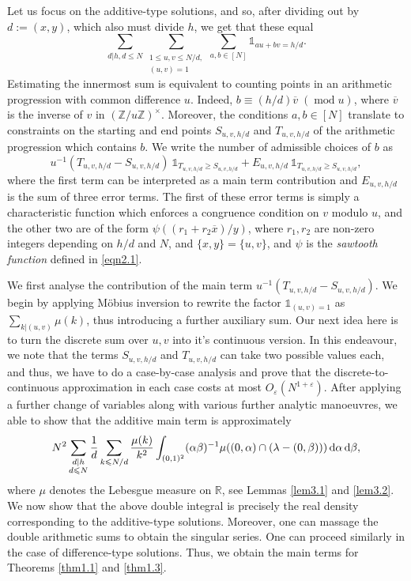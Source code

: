 \documentclass[12pt,reqno]{amsart}
\theoremstyle{definition}
\theoremstyle{remark}
\numberwithin{equation}{section}
\DeclareMathOperator{\Mod}{mod}
\newcommand{\mmod}[1]{\;(\Mod{ #1})}
\renewcommand{\geq}{\geqslant}
\renewcommand{\leq}{\leqslant}
\def\eps{\varepsilon}
\def\d{{\,{\rm d}}}
\newcommand\1{\mathds{1}}
\begin{document}
Let us focus on the additive-type solutions, and so, after dividing out by $d:= (x,y)$, which also must divide $h$, we get that these equal
\[ \sum_{d|h, d \leq N}  \sum_{\substack{ 1 \leq u, v \leq N/d , \\ (u,v) = 1}} \sum_{a,b \in [N]} \1_{au + bv = h/d} .\]
Estimating the innermost sum is equivalent to counting points in an arithmetic progression with common difference $u$. Indeed, $b \equiv (h/d) \overline{v} \mmod{u}$, where $\overline{v}$ is the inverse of $v$ in $(\mathbb{Z}/u \mathbb{Z})^{\times}$. Moreover, the conditions $a,b \in [N]$ translate to constraints on the starting and end points $S_{u,v,h/d}$ and $T_{u,v,h/d}$ of the arithmetic progression which contains $b$. We write the number of admissible choices of $b$ as 
\[ u^{-1}(T_{u,v,h/d} - S_{u,v,h/d} ) \ \1_{T_{u,v,h/d} \geq S_{u,v,h/d}}   + E_{u,v,h/d} \ \1_{T_{u,v,h/d} \geq S_{u,v,h/d}} ,\]
where the first term can be interpreted as a main term contribution and $E_{u,v,h/d}$ is the sum of three error terms. The first of these error terms is simply a characteristic function which enforces a congruence condition on $v$ modulo $u$, and the other two are of the form $\psi((r_1 + r_2 \overline{x})/y)$, where $r_1, r_2$ are non-zero integers depending on $h/d$ and $N$, and $\{x,y\} = \{u,v\}$, and $\psi$ is the \emph{sawtooth function} defined in \eqref{eqn2.1}. 

We first analyse the contribution of the main term $u^{-1}(T_{u,v,h/d} - S_{u,v,h/d} )$. We begin by applying M\"{o}bius inversion to rewrite the factor $\1_{(u,v) =1}$ as $\sum_{k|(u,v)}\mu(k)$, thus introducing a further auxiliary sum. Our next idea here is to turn the discrete sum over $u,v$ into it's continuous version. In this endeavour, we note that the terms $S_{u,v,h/d}$ and $T_{u,v,h/d}$ can take two possible values each, and thus, we have to do a case-by-case analysis and prove that the discrete-to-continuous approximation in each case costs at most $O_{\eps}(N^{1 + \eps})$. After applying a further change of variables along with various further analytic manoeuvres, we able to show that the additive main term is approximately
\[ N^2 \sum_{\substack{d|h \\ d \leqslant N}} \frac{1}{d} \sum_{k\leqslant N/d}\frac{\mu(k)}{k^2} \int_{(0,1)^2} (\alpha \beta)^{-1}  \mu((0, \alpha)\cap (\lambda - (0, \beta ))) \d \alpha \d \beta , \]
where $\mu$ denotes the Lebesgue measure on $\mathbb{R}$, see Lemmas \ref{lem3.1} and \ref{lem3.2}. We now show that the above double integral is precisely the real density corresponding to the additive-type solutions. Moreover, one can massage the double arithmetic sums to obtain the singular series. One can proceed similarly in the case of difference-type solutions. Thus, we obtain the main terms for Theorems \ref{thm1.1} and \ref{thm1.3}.
\end{document}
